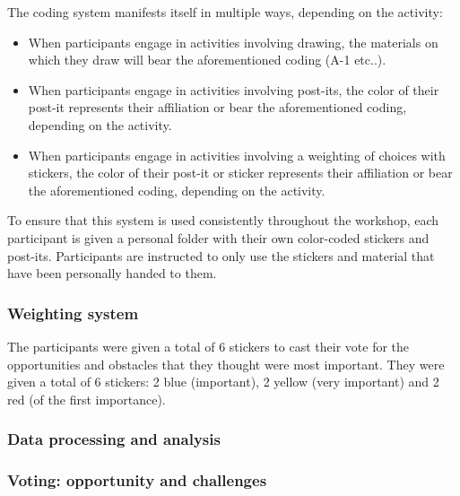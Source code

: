 The coding system manifests itself in multiple ways, depending on the activity:
\begin{itemize}
\item When participants engage in activities involving drawing, the materials on which they draw will bear the aforementioned coding (A-1 etc..).
\item When participants engage in activities involving post-its, the color of their post-it represents their affiliation or bear the aforementioned coding, depending on the activity.
\item When participants engage in activities involving a weighting of choices with stickers, the color of their post-it or sticker represents their affiliation or bear the aforementioned coding, depending on the activity.
\end{itemize}

To ensure that this system is used consistently throughout the workshop, each participant is given a personal folder with their own color-coded stickers and post-its. Participants are instructed to only use the stickers and material that have been personally handed to them.\\

\subsubsection*{Weighting system}

 The participants were given a total of 6 stickers to cast their vote for the opportunities and obstacles that they thought were most important. They were given a total of 6 stickers: 2 blue (important), 2 yellow (very important) and 2 red (of the first importance).\\

\subsubsection{Data processing and analysis}

\subsubsection*{Voting: opportunity and challenges}

